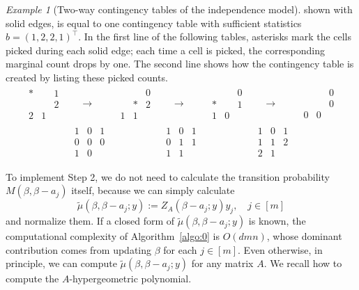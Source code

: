 \documentclass[a4paper,12pt]{article}
\theoremstyle{plain}
\theoremstyle{remark}
\newtheorem{example}[theorem]{Example}
\begin{document}
\begin{example}[Two-way contingency tables of the independence model]
shown with solid edges, is equal to one contingency
table with sufficient statistics $b=(1,2,2,1)^\top$.
In the first line of the following tables, asterisks
mark the cells picked during each solid edge; each
time a cell is picked, the corresponding marginal
count drops by one. The second line shows how
the contingency table is created by listing these
picked counts. 
\begin{align}
  \begin{array}{cc|c}
   *& &1\\
   & &2\\
  \hline  
  2& 1  
  \end{array}
  &~\quad\to&
  \begin{array}{cc|c}
   & &0\\
    &*&2\\
  \hline
  1& 1  
  \end{array}
  &~\quad\to&
  \begin{array}{cc|c}
   & &0\\
  *& &1\\
  \hline  
  1& 0  
  \end{array}
  &~\quad\to&
  \begin{array}{cc|c}
   & &0\\
    & &0\\
  \hline  
  0& 0  
  \end{array}\nonumber\\
  &
  \begin{array}{cc|c}
  1&0&1\\
  0&0&0\\
  \hline  
  1&0&   
  \end{array}& &
  \begin{array}{cc|c}
  1&0&1\\
  0&1&1\\
  \hline  
  1&1&   
  \end{array}& &
  \begin{array}{cc|c}
  1&0&1\\
  1&1&2\\
  \hline  
  2&1&   
  \end{array}&\label{tables}
\end{align}
\end{example}

To implement Step 2, we do not need to calculate the transition
probability $M(\beta,\beta-a_j)$ itself, because we can simply
calculate
\begin{equation}\label{mu_tilde}
  \tilde{\mu}(\beta,\beta-a_j;y):=Z_A(\beta-a_j;y)y_j, \quad
  j\in[m]
\end{equation}
and normalize them. If a closed form of
$\tilde{\mu}(\beta,\beta-a_j;y)$ is known, the computational
complexity of Algorithm~\ref{algo:0} is $O(dmn)$, whose dominant
contribution comes from updating $\beta$ for each $j\in[m]$.
Even otherwise, in principle, we can compute
$\tilde{\mu}(\beta,\beta-a_j;y)$ for any matrix $A$. We recall
how to compute the $A$-hypergeometric polynomial.
\end{document}
